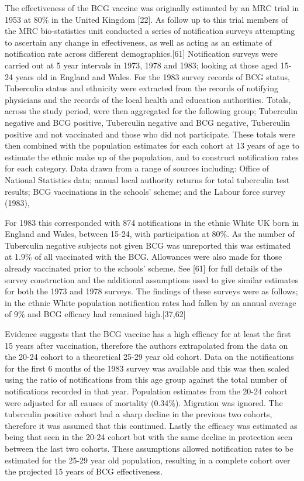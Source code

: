 \documentclass[11pt,twoside]{bristolthesis}
\begin{document}
  The effectiveness of the BCG vaccine was originally estimated by an MRC trial in 1953 at 80\% in the United Kingdom {[}22{]}. As follow up to this trial members of the MRC bio-statistics unit conducted a series of notification surveys attempting to ascertain any change in effectiveness, as well as acting as an estimate of notification rate across different demographics.{[}61{]} Notification surveys were carried out at 5 year intervals in 1973, 1978 and 1983; looking at those aged 15-24 years old in England and Wales. For the 1983 survey records of BCG status, Tuberculin status and ethnicity were extracted from the records of notifying physicians and the records of the local health and education authorities. Totals, across the study period, were then aggregated for the following group; Tuberculin negative and BCG positive, Tuberculin negative and BCG negative, Tuberculin positive and not vaccinated and those who did not participate. These totals were then combined with the population estimates for each cohort at 13 years of age to estimate the ethnic make up of the population, and to construct notification rates for each category. Data drawn from a range of sources including: Office of National Statistics data; annual local authority returns for total tuberculin test results; BCG vaccinations in the schools' scheme; and the Labour force survey (1983),
  
  For 1983 this corresponded with 874 notifications in the ethnic White UK born in England and Wales, between 15-24, with participation at 80\%. As the number of Tuberculin negative subjects not given BCG was unreported this was estimated at 1.9\% of all vaccinated with the BCG. Allowances were also made for those already vaccinated prior to the schools' scheme. See {[}61{]} for full details of the survey construction and the additional assumptions used to give similar estimates for both the 1973 and 1978 surveys. The findings of these surveys were as follows; in the ethnic White population notification rates had fallen by an annual average of 9\% and BCG efficacy had remained high.{[}37,62{]}
  
  Evidence suggests that the BCG vaccine has a high efficacy for at least the first 15 years after vaccination, therefore the authors extrapolated from the data on the 20-24 cohort to a theoretical 25-29 year old cohort. Data on the notifications for the first 6 months of the 1983 survey was available and this was then scaled using the ratio of notifications from this age group against the total number of notifications recorded in that year. Population estimates from the 20-24 cohort were adjusted for all causes of mortality (0.34\%). Migration was ignored. The tuberculin positive cohort had a sharp decline in the previous two cohorts, therefore it was assumed that this continued. Lastly the efficacy was estimated as being that seen in the 20-24 cohort but with the same decline in protection seen between the last two cohorts. These assumptions allowed notification rates to be estimated for the 25-29 year old population, resulting in a complete cohort over the projected 15 years of BCG effectiveness.
  
\end{document}
